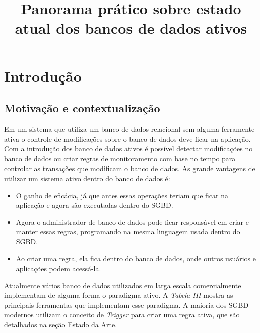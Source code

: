 \documentclass[conference]{IEEEtran}
\begin{document}
\title{Panorama prático sobre estado atual dos bancos de dados ativos}

\author{
}

\maketitle
\IEEEpeerreviewmaketitle

\section{Introdução}
  \subsection{Motivação e contextualização}
  Em um sistema que utiliza um banco de dados relacional sem alguma ferramente ativa o controle de modificações sobre o banco de dados deve ficar na aplicação. Com a introdução dos banco de dados
  ativos é possível detectar modificações no banco de dados ou criar regras de monitoramento com base no tempo para controlar as transações que modificam o banco de dados. As grande vantagens
  de utilizar um sistema ativo dentro do banco de dados é:
  \begin{itemize}
    \item O ganho de eficácia, já que antes essas operações teriam que ficar na aplicação e agora são executadas dentro do SGBD. \\
    \item Agora o administrador de banco de dados pode ficar responsável em criar e manter essas regras, programando na mesma linguagem usada dentro do SGBD.\\
    \item Ao criar uma regra, ela fica dentro do banco de dados, onde outros usuários e aplicações podem acessá-la.
  \end{itemize}
  Atualmente vários banco de dados utilizados em larga escala comercialmente implementam de alguma forma o paradigma ativo. A \textit{Tabela III} mostra as principais ferramentas que implementam esse paradigma. A maioria dos SGBD modernos utilizam o conceito de \textit{Trigger} para criar uma regra ativa, que são detalhados na seção Estado da Arte.
\end{document}
